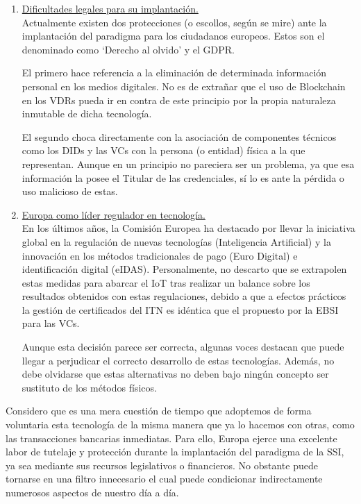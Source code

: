 \documentclass[../main.tex]{subfiles}
\begin{document}
\begin{enumerate}
    \item \underline{Dificultades legales para su implantación.}
    \\ Actualmente existen dos protecciones (o escollos, según se mire) ante la implantación del paradigma para los ciudadanos europeos. Estos son el denominado como `Derecho al olvido' y el \acrfull{GDPR}.

    El primero hace referencia a la eliminación de determinada información personal en los medios digitales. No es de extrañar que el uso de Blockchain en los \acrshort{VDR}s pueda ir en contra de este principio por la propia naturaleza inmutable de dicha tecnología.

    El segundo choca directamente con la asociación de componentes técnicos como los \acrshort{DID}s y las \acrshort{VC}s con la persona (o entidad) física a la que representan. Aunque en un principio no pareciera ser un problema, ya que esa información la posee el Titular de las credenciales, sí lo es ante la pérdida o uso malicioso de estas.
    \\

    \item \underline{Europa como líder regulador en tecnología.}
    \\ En los últimos años, la Comisión Europea ha destacado por llevar la iniciativa global en la regulación de nuevas tecnologías (Inteligencia Artificial) y la innovación en los métodos tradicionales de pago (Euro Digital) e identificación digital (\acrshort{eIDAS}). Personalmente, no descarto que se extrapolen estas medidas para abarcar el \acrshort{IoT} tras realizar un balance sobre los resultados obtenidos con estas regulaciones, debido a que a efectos prácticos la gestión de certificados del \acrshort{ITN} es idéntica que el propuesto por la \acrshort{EBSI} para las \acrshort{VC}s.

    Aunque esta decisión parece ser correcta, algunas voces destacan que puede llegar a perjudicar el correcto desarrollo de estas tecnologías. Además, no debe olvidarse que estas alternativas no deben bajo ningún concepto ser sustituto de los métodos físicos. 
    \\

\end{enumerate}

\begin{tcolorbox}[colback=gray!10!white, colframe=gray!50!black, title=Conclusión General]\label{conclusion-general}
Considero que es una mera cuestión de tiempo que adoptemos de forma voluntaria esta tecnología de la misma manera que ya lo hacemos con otras, como las transacciones bancarias inmediatas.
Para ello, Europa ejerce una excelente labor de tutelaje y protección durante la implantación del paradigma de la \acrshort{SSI}, ya sea mediante sus recursos legislativos o financieros. No obstante puede tornarse en una filtro innecesario el cual puede condicionar indirectamente numerosos aspectos de nuestro día a día.
\end{tcolorbox}
\end{document}
